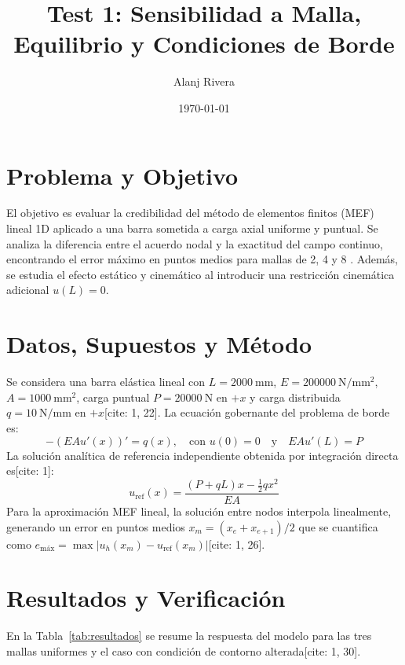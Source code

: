 \documentclass[11pt]{article}
\title{\textbf{Test 1: Sensibilidad a Malla, Equilibrio y Condiciones de Borde}}
\author{Alanj Rivera}
\date{\today}
\begin{document}
\maketitle

\section{Problema y Objetivo}
El objetivo es evaluar la credibilidad del método de elementos finitos (MEF) lineal 1D aplicado a una barra sometida a carga axial uniforme y puntual. Se analiza la diferencia entre el acuerdo nodal y la exactitud del campo continuo, encontrando el error máximo en puntos medios para mallas de 2, 4 y 8 . Además, se estudia el efecto estático y cinemático al introducir una restricción cinemática adicional $u(L)=0$.

\section{Datos, Supuestos y Método}
Se considera una barra elástica lineal con $L = \SI{2000}{\mm}$, $E = \SI{200000}{\N\per\mm\squared}$, $A = \SI{1000}{\mm\squared}$, carga puntual $P = \SI{20000}{\N}$ en $+x$ y carga distribuida $q = \SI{10}{\N\per\mm}$ en $+x$[cite: 1, 22]. La ecuación gobernante del problema de borde es:
\begin{equation}
-(EA u'(x))' = q(x), \quad \text{con } u(0) = 0 \quad \text{y} \quad EA u'(L) = P
\end{equation}
La solución analítica de referencia independiente obtenida por integración directa es[cite: 1]:
\begin{equation}
u_{\text{ref}}(x) = \frac{(P + qL)x - \frac{1}{2}q x^2}{EA}
\end{equation}
Para la aproximación MEF lineal, la solución entre nodos interpola linealmente, generando un error en puntos medios $x_m = (x_e + x_{e+1})/2$ que se cuantifica como $e_{\text{máx}} = \max |u_h(x_m) - u_{\text{ref}}(x_m)|$[cite: 1, 26].

\section{Resultados y Verificación}
En la Tabla~\ref{tab:resultados} se resume la respuesta del modelo para las tres mallas uniformes y el caso con condición de contorno alterada[cite: 1, 30].
\end{document}
